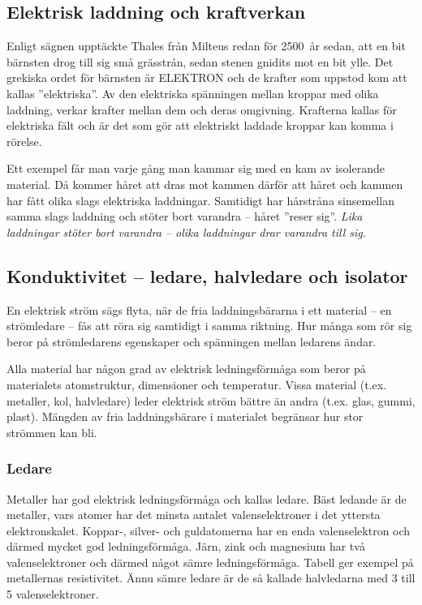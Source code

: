 \subsection{Elektrisk laddning och kraftverkan}

Enligt sägnen upptäckte Thales från Milteus redan för 2500~år sedan, att en bit
bärnsten drog till sig små grässtrån, sedan stenen gnidits mot en bit ylle.
Det grekiska ordet för bärnsten är ELEKTRON och de krafter som uppstod kom att
kallas ''elektriska''.
Av den elektriska spänningen mellan kroppar med olika laddning, verkar krafter
mellan dem och deras omgivning.
Krafterna kallas för elektriska fält och är det som gör att elektriskt laddade
kroppar kan komma i rörelse.


Ett exempel får man varje gång man kammar sig med en kam av isolerande material.
Då kommer håret att dras mot kammen därför att håret och kammen har
fått olika slags elektriska laddningar.
Samtidigt har hårstråna sinsemellan samma slags laddning och stöter bort
varandra -- håret ''reser sig''.
\emph{Lika laddningar stöter bort varandra -- olika laddningar drar varandra till sig.}

\subsection{Konduktivitet -- ledare, halvledare och isolator}
\label{konduktivitet}

En elektrisk ström sägs flyta, när de fria laddningsbärarna i ett material -- en
strömledare -- fås att röra sig samtidigt i samma riktning.
Hur många som rör sig beror på strömledarens egenskaper och spänningen mellan
ledarens ändar.

Alla material har någon grad av elektrisk ledningsförmåga som beror på
materialets atomstruktur, dimensioner och temperatur.
Vissa material (t.ex. metaller, kol, halvledare) leder elektrisk ström bättre
än andra (t.ex. glas, gummi, plast).
Mängden av fria laddningsbärare i materialet begränsar hur stor strömmen kan
bli.

\subsubsection{Ledare}
\label{ledare}

Metaller har god elektrisk ledningsförmåga och kallas ledare.
Bäst ledande är de metaller, vars atomer har det minsta antalet
valenselektroner i det yttersta elektronskalet.
Koppar-, silver- och guldatomerna har en enda valenselektron och därmed mycket
god ledningsförmåga.
Järn, zink och magnesium har två valenselektroner och därmed något sämre
ledningsförmåga.
Tabell  ger exempel på metallernas resistivitet.
Ännu sämre ledare är de så kallade halvledarna med 3 till 5 valenselektroner.

